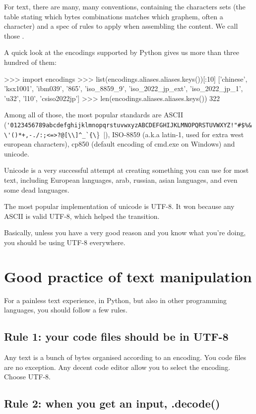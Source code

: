 For text, there are many, many conventions, containing the characters sets (the table stating which bytes combinations matches which graphem, often a character) and a spec of rules to apply when assembling the content. We call those .

A quick look at the encodings supported by Python gives us more than three hundred of them:

\begin{py3}
>>> import encodings
>>> list(encodings.aliases.aliases.keys())[:10]
['chinese', 'ksx1001', 'ibm039', '865', 'iso_8859_9', 'iso_2022_jp_ext', 'iso_2022_jp_1', 'u32', 'l10', 'csiso2022jp']
>>> len(encodings.aliases.aliases.keys())
322
\end{py3}

Among all of those, the most popular standards are ASCII (\lstinline|'0123456789abcdefghijklmnopqrstuvwxyzABCDEFGHIJKLMNOPQRSTUVWXYZ!"#$%&\'()*+,-./:;<=>?@[\\]^_`{\|\}~|), ISO-8859 (a.k.a latin-1, used for extra west european characters), cp850 (default encoding of cmd.exe on Windows) and unicode.

Unicode is a very successful attempt at creating something you can use for most text, including European languages, arab, russian, asian languages, and even some dead languages.

The most popular implementation of unicode is UTF-8. It won because any ASCII is valid UTF-8, which helped the transition.

Basically, unless you have a very good reason and you know what you're doing, you should be using UTF-8 everywhere.

\section{Good practice of text manipulation}

For a painless text experience, in Python, but also in other programming languages, you should follow a few rules.

\subsection{Rule 1: your code files should be in UTF-8}

Any text is a bunch of bytes organised according to an encoding. You code files are no exception. Any decent code editor allow you to select the encoding. Choose UTF-8.

\subsection{Rule 2: when you get an input, .decode()}

